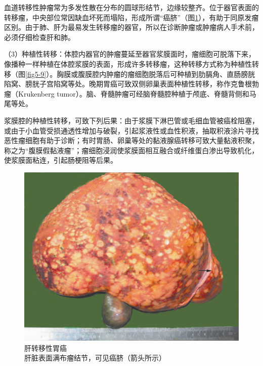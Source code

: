 血道转移性肿瘤常为多发性散在分布的圆球形结节，边缘较整齐。位于器官表面的转移瘤，中央部位常因缺血坏死而塌陷，形成所谓“癌脐”（图\ref{fig5-8}），有助于同原发瘤区别。由于肺、肝为最易发生转移瘤的器官，所以在诊断肿瘤或肿瘤病人手术前，必须仔细检查肝和肺。

（3）种植性转移：体腔内器官的肿瘤蔓延至器官浆膜面时，瘤细胞可脱落下来，像播种一样种植在体腔浆膜的表面，形成许多转移瘤，这种转移方式称为种植性转移（图\ref{fig5-9}）。胸膜或腹膜腔内肿瘤的瘤细胞脱落后可种植到肋膈角、直肠膀胱陷窝、膀胱子宫陷窝等处。晚期胃癌可致双侧卵巢表面种植性转移，称作克鲁根勃瘤（Krukenberg
tumor）。脑、脊髓肿瘤可经脑脊髓腔种植于颅底、脊髓背侧和马尾等处。

浆膜腔的种植性转移，可致下列后果：由于浆膜下淋巴管或毛细血管被癌栓阻塞，或由于小血管受损通透性增加与破裂，引起浆液性或血性积液，抽取积液涂片寻找恶性瘤细胞有助于诊断；有时胃肠、卵巢等处的黏液腺癌转移可致大量黏液积聚，称之为“腹膜假黏液瘤”；瘤细胞浸润使浆膜面相互融合或纤维蛋白渗出导致机化，使浆膜面粘连，引起肠梗阻等后果。

\begin{figure}[!htbp]
 \centering
 \includegraphics{./images/Image00075.jpg}
 \caption{肝转移性胃癌 \\ {\small 肝脏表面满布瘤结节，可见癌脐（箭头所示）}}
 \label{fig5-8}
  \end{figure}



